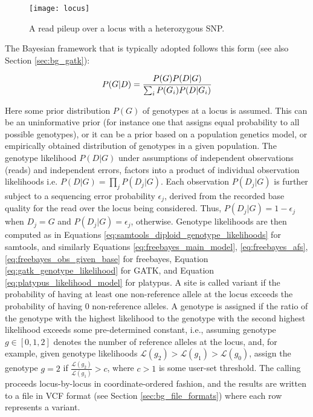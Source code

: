 \begin{figure}[H]
    \texttt{[image: locus]}
    \centering
    \caption {A read pileup over a locus with a heterozygous SNP.}
    \label{fig:main_body_locus}
\end{figure}

The Bayesian framework that is typically adopted follows this form (see also Section \ref{sec:bg_gatk}):

\begin{equation}
    \label{eq:main_body_gatk_genotyping}
P(G|D) = {P(G)P(D|G)\over\sum_i P(G_i)P(D|G_i)}
\end{equation}

Here some prior distribution $P(G)$ of genotypes at a locus is assumed. This can be an uninformative prior (for instance one that assigns equal probability to all possible genotypes), or it can be a prior based on a population genetics model, or empirically obtained distribution of genotypes in a given population. The genotype likelihood $P(D|G)$ under assumptions of independent observations (reads) and independent errors, factors into a product of individual observation likelihoods i.e. $P(D|G) = \prod_j{P(D_j|G)}$. Each observation $P(D_j|G)$ is further subject to a sequencing error probability $\epsilon_j$, derived from the recorded base quality for the read over the locus being considered. Thus, $P(D_j|G) = 1 - \epsilon_j$ when $D_j = G$ and $P(D_j|G) = \epsilon_j$, otherwise. Genotype likelihoods are then computed as in Equations \ref{eq:samtools_diploid_genotype_likelihoods} for samtools, and similarly Equations \ref{eq:freebayes_main_model}, \ref{eq:freebayes_afs}, \ref{eq:freebayes_obs_given_base} for freebayes, Equation \ref{eq:gatk_genotype_likelihood} for GATK, and Equation \ref{eq:platypus_likelihood_model} for platypus. A site is called variant if the probability of having at least one non-reference allele at the locus exceeds the probability of having 0 non-reference alleles. A genotype is assigned if the ratio of the genotype with the highest likelihood to the genotype with the second highest likelihood exceeds some pre-determined constant, i.e., assuming genotype $g \in [0,1,2]$ denotes the number of reference alleles at the locus, and, for example, given genotype likelihoods $\mathcal{L}(g_2) > \mathcal{L}(g_1) > \mathcal{L}(g_0)$, assign the genotype $g=2$ if $\frac{\mathcal{L}(g_2)}{\mathcal{L}(g_1)} > c$, where $c > 1$ is some user-set threshold. The calling proceeds locus-by-locus in coordinate-ordered fashion, and the results are written to a file in VCF format (see Section \ref{sec:bg_file_formats}) where each row represents a variant.

